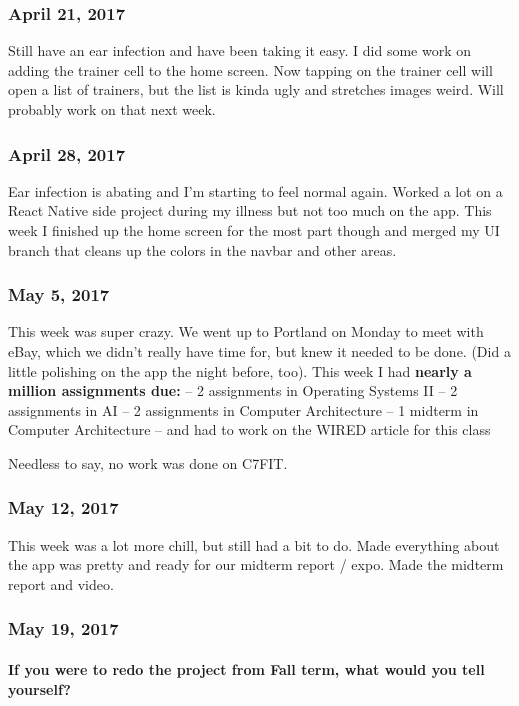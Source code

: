 \subsubsection{April 21, 2017}\label{section}
Still have an ear infection and have been taking it easy. I did some
work on adding the trainer cell to the home screen. Now tapping on the
trainer cell will open a list of trainers, but the list is kinda ugly
and stretches images weird. Will probably work on that next week.

\subsubsection{April 28, 2017}\label{section}
Ear infection is abating and I'm starting to feel normal again. Worked a
lot on a React Native side project during my illness but not too much on
the app. This week I finished up the home screen for the most part
though and merged my UI branch that cleans up the colors in the navbar
and other areas.

\subsubsection{May 5, 2017}\label{section}
This week was super crazy. We went up to Portland on Monday to meet with
eBay, which we didn't really have time for, but knew it needed to be
done. (Did a little polishing on the app the night before, too). This
week I had \textbf{nearly a million assignments due:} – 2 assignments in
Operating Systems II – 2 assignments in AI – 2 assignments in Computer
Architecture – 1 midterm in Computer Architecture – and had to work on
the WIRED article for this class

Needless to say, no work was done on C7FIT.

\subsubsection{May 12, 2017}\label{section}
This week was a lot more chill, but still had a bit to do. Made
everything about the app was pretty and ready for our midterm report /
expo. Made the midterm report and video.

\subsubsection{May 19, 2017}\label{section}
\paragraph{If you were to redo the project from Fall term, what would
you tell
yourself?}\label{if-you-were-to-redo-the-project-from-fall-term-what-would-you-tell-yourself}

